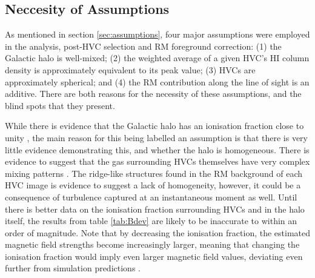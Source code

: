 \subsection{Neccesity of Assumptions}
\label{ssec:B2}

As mentioned in section \ref{sec:assumptions}, four major assumptions were employed in the analysis, post-HVC selection and RM foreground correction: (1) the Galactic halo is well-mixed; (2) the weighted average of a given HVC's HI column density is approximately equivalent to its peak value; (3) HVCs are approximately spherical; and (4) the RM contribution along the line of sight is an additive. There are both reasons for the necessity of these assumptions, and the blind spots that they present.


While there is evidence that the Galactic halo has an ionisation fraction close to unity \citep{ID23}, the main reason for this being labelled an assumption is that there is very little evidence demonstrating this, and whether the halo is homogeneous. There is evidence to suggest that the gas surrounding HVCs themselves have very complex mixing patterns \cite{ID69, ID4}. The ridge-like structures found in the RM background of each HVC image is evidence to suggest a lack of homogeneity, however, it could be a consequence of turbulence captured at an instantaneous moment as well. Until there is better data on the ionisation fraction surrounding HVCs and in the halo itself, the results from table \ref{tab:Bdev} are likely to be inaccurate to within an order of magnitude. Note that by decreasing the ionisation fraction, the estimated magnetic field strengths become increasingly larger, meaning that changing the ionisation fraction would imply even larger magnetic field values, deviating even further from simulation predictions \citep{ID24}.


